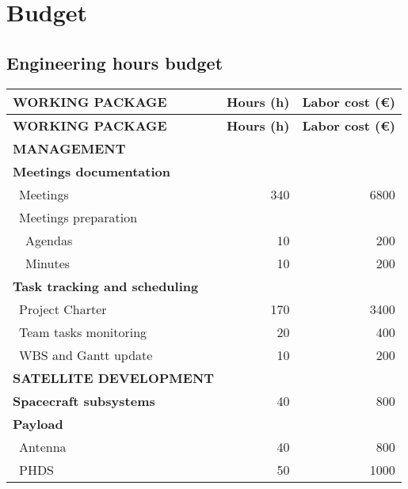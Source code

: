 %

\section{Budget}
\subsection{Engineering hours budget}

\begin{longtable}{| l | r | r | }
\hline
\rowcolor[gray]{0.65}	\textbf{WORKING PACKAGE} &  \textbf{Hours (h)}     & \textbf{Labor cost (\euro)}   \\ \hline
\hline
\endfirsthead

\hline
\rowcolor[gray]{0.65}	\textbf{WORKING PACKAGE} &  \textbf{Hours (h)}     & \textbf{Labor cost (\euro)}   \\
\hline
\endhead

\rowcolor[gray]{0.85} \textbf{MANAGEMENT} &  &  \\

	\textbf{Meetings documentation} & & \\
	   \blue ~Meetings & 340  & 6800  \\
	   \blue ~Meetings preparation & &   \\
	   ~~Agendas & 10 & 200 \\
	   ~~Minutes & 10 & 200 \\
	\hline
	\textbf{Task tracking and scheduling} & & \\
	   \blue ~Project Charter & 170 & 3400  \\
	   \blue ~Team tasks monitoring & 20 & 400  \\
	   \blue ~WBS and Gantt update & 10 & 200 \\

\rowcolor[gray]{0.85}	\textbf{SATELLITE DEVELOPMENT} &  &   \\
	
	\textbf{Spacecraft subsystems} & 40  & 800 \\
	\hline
	\textbf{Payload} &   &  \\
	   \blue ~Antenna & 40  & 800  \\
	   \blue ~PHDS & 50  & 1000  \\


\end{longtable}
